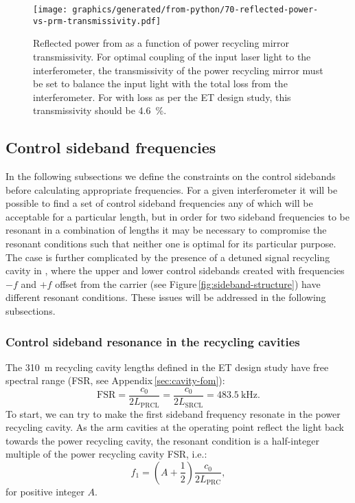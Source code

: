 \begin{figure}
  \centering
  \texttt{[image: graphics/generated/from-python/70-reflected-power-vs-prm-transmissivity.pdf]}
  \caption[Reflected power from \ETLF{} as a function of power recycling mirror transmissivity]{\label{fig:reflected-power-vs-prm-trans}Reflected power from \ETLF{} as a function of power recycling mirror transmissivity. For optimal coupling of the input laser light to the interferometer, the transmissivity of the power recycling mirror must be set to balance the input light with the total loss from the interferometer. For \ETLF{} with loss as per the \gls{ET} design study, this transmissivity should be \SI{4.6}{\percent}.}
\end{figure}

\subsection{\label{sec:control-sideband-freqs}Control sideband frequencies}
In the following subsections we define the constraints on the control sidebands before calculating appropriate frequencies. For a given interferometer it will be possible to find a set of control sideband frequencies any of which will be acceptable for a particular length, but in order for two sideband frequencies to be resonant in a combination of lengths it may be necessary to compromise the resonant conditions such that neither one is optimal for its particular purpose. The case is further complicated by the presence of a detuned signal recycling cavity in \ETLF{}, where the upper and lower control sidebands created with frequencies $-f$ and $+f$ offset from the carrier (see Figure\,\ref{fig:sideband-structure}) have different resonant conditions. These issues will be addressed in the following subsections.

\subsubsection{Control sideband resonance in the recycling cavities}
The \SI{310}{\meter} recycling cavity lengths defined in the \gls{ET} design study have free spectral range (\gls{FSR}, see Appendix\,\ref{sec:cavity-fom}):
\begin{equation}
  \text{FSR} = \frac{c_0}{2 L_{\text{PRCL}}} = \frac{c_0}{2 L_{\text{SRCL}}} = \SI{483.5}{\kilo\hertz}.
\end{equation}
To start, we can try to make the first sideband frequency resonate in the power recycling cavity. As the arm cavities at the operating point reflect the light back towards the power recycling cavity, the resonant condition is a half-integer multiple of the power recycling cavity \gls{FSR}, i.e.:
\begin{equation}
  \label{eq:prc-fsr}
  f_1 = \left(A + \frac{1}{2} \right) \frac{c_0}{2 L_{\text{PRC}}},
\end{equation}
for positive integer $A$.

